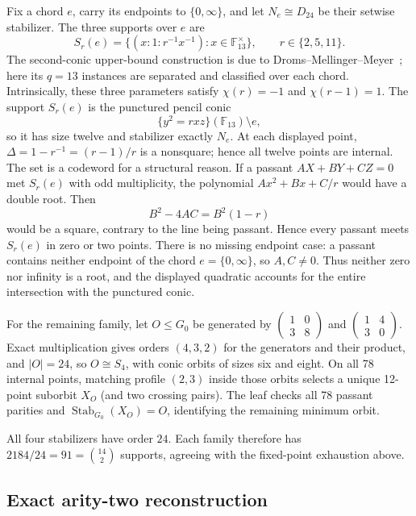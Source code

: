 \documentclass[11pt]{article}
\theoremstyle{definition}
\theoremstyle{remark}
\newcommand{\F}{\mathbb F}
\begin{document}
Fix a chord \(e\), carry its endpoints to \(\{0,\infty\}\), and let
\(N_e\cong D_{24}\) be their setwise stabilizer.  The three supports over
\(e\) are
\[
 S_r(e)=\{(x:1:r^{-1}x^{-1}):x\in\F_{13}^{\times}\},
 \qquad r\in\{2,5,11\}.
\]
The second-conic upper-bound construction is due to
Droms--Mellinger--Meyer~\cite[proof of Theorem~4.9]{DromsMellingerMeyer2006};
here its \(q=13\) instances are separated and classified over each chord.
Intrinsically, these three parameters satisfy
\(\chi(r)=-1\) and \(\chi(r-1)=1\).  The support \(S_r(e)\) is the
punctured pencil conic
\[
 \{y^2=rxz\}(\F_{13})\setminus e,
\]
so it has size twelve and stabilizer exactly \(N_e\).  At each displayed
point, \(\Delta=1-r^{-1}=(r-1)/r\) is a nonsquare; hence all twelve points
are internal.  The set is a codeword for a structural reason.  If a passant
\(AX+BY+CZ=0\) met \(S_r(e)\) with odd multiplicity, the polynomial
\(Ax^2+Bx+C/r\) would have a double root.  Then
\[
 B^2-4AC=B^2(1-r)
\]
would be a square, contrary to the line being passant.  Hence every passant
meets \(S_r(e)\) in zero or two points.  There is no missing endpoint case:
a passant contains neither endpoint of the chord \(e=\{0,\infty\}\), so
\(A,C\ne0\).  Thus neither zero nor infinity is a root, and the displayed
quadratic accounts for the entire intersection with the punctured conic.

For the remaining family, let \(O\le G_0\) be generated by
\(\left(\begin{smallmatrix}1&0\\3&8\end{smallmatrix}\right)\) and
\(\left(\begin{smallmatrix}1&4\\3&0\end{smallmatrix}\right)\).
Exact multiplication gives orders \((4,3,2)\) for the generators and their
product, and \(|O|=24\), so \(O\cong S_4\), with conic orbits of sizes six
and eight.  On all 78 internal points, matching profile \((2,3)\) inside
those orbits selects a unique 12-point suborbit \(X_O\) (and two crossing
pairs).  The leaf checks all 78 passant parities and
\(\operatorname{Stab}_{G_0}(X_O)=O\), identifying the remaining minimum orbit.

All four stabilizers have order \(24\).  Each family therefore has
\(2184/24=91=\binom{14}{2}\) supports, agreeing with the fixed-point
exhaustion above.

\subsection{Exact arity-two reconstruction}
\label{sec:pair-reconstruction}
\end{document}
